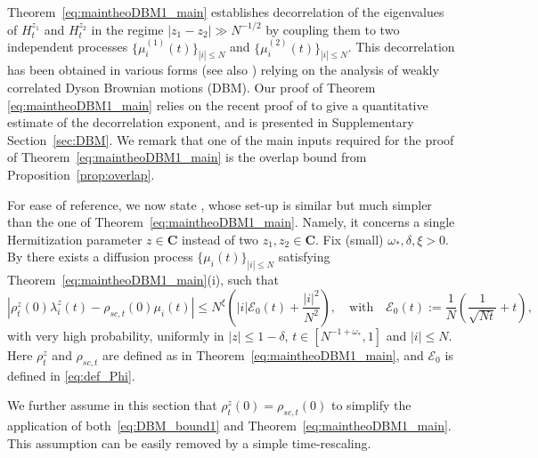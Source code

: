 \documentclass[10pt]{amsart}
\numberwithin{equation}{section}
\newcommand{\C}{\mathbf{C}}
\begin{document}
Theorem~\ref{eq:maintheoDBM1_main} establishes decorrelation of the eigenvalues of $H^{z_1}_t$ and $H^{z_2}_t$ in the regime $|z_1-z_2|\gg N^{-1/2}$ by coupling them to two independent processes $\{\mu^{(1)}_i(t)\}_{|i|\le N}$ and $\{\mu^{(2)}_i(t)\}_{|i|\le N}$. This decorrelation has been obtained in various forms \cite{bourgade2024fluctuations, macroCLT_complex, cipolloni2024maximum} (see also \cite{cipolloni2023quenched}) relying on the analysis of weakly correlated Dyson Brownian motions (DBM). Our proof of Theorem \ref{eq:maintheoDBM1_main} relies on the recent proof of \cite[Theorem~4.1]{bourgade2024fluctuations} to give a quantitative estimate of the decorrelation exponent, and is presented in Supplementary Section~\ref{sec:DBM}. We remark that one of the main inputs required for the proof of Theorem~\ref{eq:maintheoDBM1_main} is the overlap bound from Proposition~\ref{prop:overlap}.


For ease of reference, we now state \cite[Proposition~4.6]{bourgade2024fluctuations}, whose set-up is similar but much simpler than the one of Theorem~\ref{eq:maintheoDBM1_main}. Namely, it concerns a single Hermitization parameter $z\in\C$ instead of two $z_1, z_2\in\C$. Fix (small) $\omega_*,\delta,\xi>0$. By \cite[Proposition~4.6]{bourgade2024fluctuations} there exists a diffusion process $\{\mu_i(t)\}_{|i|\le N}$ satisfying Theorem~\ref{eq:maintheoDBM1_main}(i), such that
\begin{equation}
\left\vert\rho_t^{z}(0)\lambda^z_i(t)-\rho_{sc,t}(0)\mu_i(t)\right\vert \le N^\xi \left(|i|\mathcal{E}_0(t)+\frac{|i|^2}{N^2}\right),\quad\text{with}\quad \mathcal{E}_0(t):=\frac{1}{N}\left(\frac{1}{\sqrt{Nt}}+t\right),
\label{eq:DBM_bound1}
\end{equation}
with very high probability, uniformly in $|z|\le 1-\delta$, $t\in [N^{-1+\omega_*},1]$ and $|i|\le N$. Here $\rho_t^z$ and $\rho_{sc,t}$ are defined as in Theorem~\ref{eq:maintheoDBM1_main}, and $\mathcal{E}_0$ is defined in \eqref{eq:def_Phi}.



We further assume in this section that $\rho_t^z(0)=\rho_{sc,t}(0)$ to simplify the application of both~\eqref{eq:DBM_bound1} and Theorem~\ref{eq:maintheoDBM1_main}. This assumption can be easily removed by a simple time-rescaling. 
\end{document}

